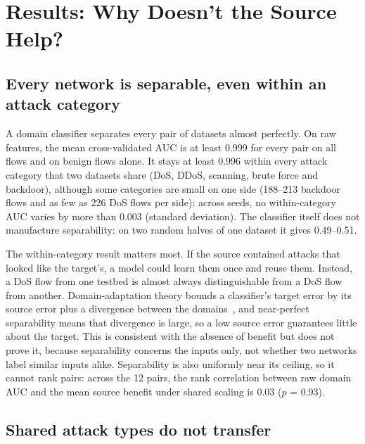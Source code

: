 \documentclass[11pt]{article}
\begin{document}
\section{Results: Why Doesn't the Source Help?}

\subsection{Every network is separable, even within an attack category}

A domain classifier separates every pair of datasets almost perfectly. On raw features, the mean cross-validated AUC is at least 0.999 for every pair on all flows and on benign flows alone. It stays at least 0.996 within every attack category that two datasets share (DoS, DDoS, scanning, brute force and backdoor), although some categories are small on one side (188--213 backdoor flows and as few as 226 DoS flows per side); across seeds, no within-category AUC varies by more than 0.003 (standard deviation). The classifier itself does not manufacture separability: on two random halves of one dataset it gives 0.49--0.51.

The within-category result matters most. If the source contained attacks that looked like the target's, a model could learn them once and reuse them. Instead, a DoS flow from one testbed is almost always distinguishable from a DoS flow from another. Domain-adaptation theory bounds a classifier's target error by its source error plus a divergence between the domains~\cite{bendavid2010theory}, and near-perfect separability means that divergence is large, so a low source error guarantees little about the target. This is consistent with the absence of benefit but does not prove it, because separability concerns the inputs only, not whether two networks label similar inputs alike. Separability is also uniformly near its ceiling, so it cannot rank pairs: across the 12 pairs, the rank correlation between raw domain AUC and the mean source benefit under shared scaling is 0.03 ($p$ = 0.93).

\subsection{Shared attack types do not transfer}
\end{document}
